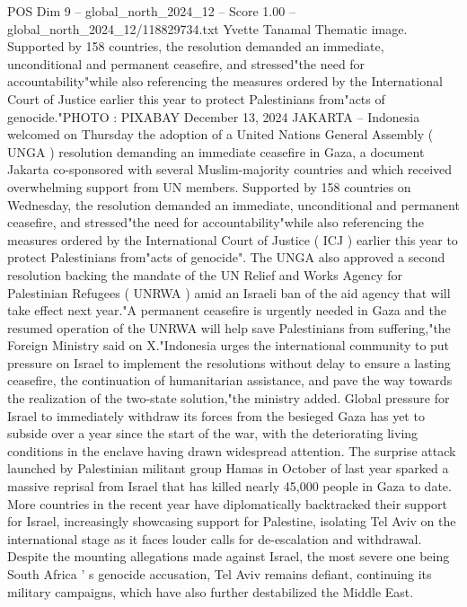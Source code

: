 \begin{textsample}{POS Dim 9 – global\_north\_2024\_12 – Score 1.00 – global\_north\_2024\_12/118829734.txt}  \label{ex:f9_pos_329}
Yvette Tanamal Thematic image.
Supported by 158 countries, the resolution demanded an immediate, unconditional and permanent ceasefire, and stressed"the need for accountability"while also referencing the measures ordered by the International Court of Justice earlier this year to protect Palestinians from"acts of genocide."PHOTO : PIXABAY December 13, 2024 JAKARTA -- Indonesia welcomed on Thursday the adoption of a United Nations General Assembly ( UNGA ) resolution demanding an immediate ceasefire in Gaza, a document Jakarta co-sponsored with several Muslim-majority countries and which received overwhelming support from UN members.
Supported by 158 countries on Wednesday, the resolution demanded an immediate, unconditional and permanent ceasefire, and stressed"the need for accountability"while also referencing the measures ordered by the International Court of Justice ( ICJ ) earlier this year to protect Palestinians from"acts of genocide".
The UNGA also approved a second resolution backing the mandate of the UN Relief and Works Agency for Palestinian Refugees ( UNRWA ) amid an Israeli ban of the aid agency that will take effect next year."A permanent ceasefire is urgently needed in Gaza and the resumed operation of the UNRWA will help save Palestinians from suffering,"the Foreign Ministry said on X."Indonesia urges the international community to put pressure on Israel to implement the resolutions without delay to ensure a lasting ceasefire, the continuation of humanitarian assistance, and pave the way towards the realization of the two-state solution,"the ministry added.
Global pressure for Israel to immediately withdraw its forces from the besieged Gaza has yet to subside over a year since the start of the war, with the deteriorating living conditions in the enclave having drawn widespread attention.
The surprise attack launched by Palestinian militant group Hamas in October of last year sparked a massive reprisal from Israel that has killed nearly 45,000 people in Gaza to date.
More countries in the recent year have diplomatically backtracked their support for Israel, increasingly showcasing support for Palestine, isolating Tel Aviv on the international stage as it faces louder calls for de-escalation and withdrawal.
Despite the mounting allegations made against Israel, the most severe one being South Africa ' s genocide accusation, Tel Aviv remains defiant, continuing its military campaigns, which have also further destabilized the Middle East.

\end{textsample}

